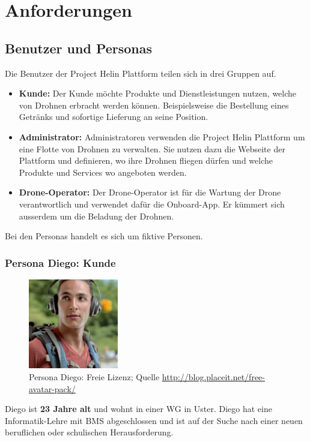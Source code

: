 \chapter{Anforderungen}
\section{Benutzer und Personas}
Die Benutzer der Project Helin Plattform teilen sich in drei Gruppen auf.
\begin{itemize}
	\item{\textbf{Kunde:} Der Kunde möchte Produkte und Dienstleistungen nutzen, welche von Drohnen erbracht werden können. Beispielsweise die Bestellung eines Getränks und sofortige Lieferung an seine Position.}
	\item{\textbf{Administrator:} Administratoren verwenden die Project Helin Plattform um eine Flotte von Drohnen zu verwalten. Sie nutzen dazu die Webseite der Plattform und definieren, wo ihre Drohnen fliegen dürfen und welche Produkte und Services wo angeboten werden.}
	\item{\textbf{Drone-Operator:} Der Drone-Operator ist für die Wartung der Drone verantwortlich und verwendet dafür die Onboard-App. Er kümmert sich ausserdem um die Beladung der Drohnen.}
\end{itemize}

Bei den Personas handelt es sich um fiktive Personen.
\subsection{Persona Diego: Kunde}
\begin{figure}[h]
\centering
\includegraphics[width=0.35\textwidth]{images/persona-diego.jpg}
\caption{Persona Diego: Freie Lizenz; Quelle 
\protect\url{http://blog.placeit.net/free-avatar-pack/}}
\label{fig:diego}
\end{figure}
Diego ist \textbf{23 Jahre alt} und wohnt in einer WG in Uster.
Diego hat eine Informatik-Lehre mit BMS abgeschlossen und ist auf der Suche nach einer neuen beruflichen oder schulischen Herausforderung.
